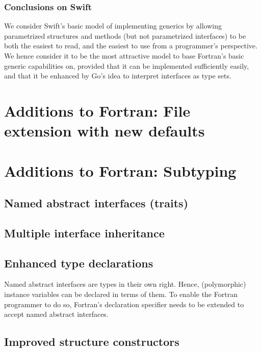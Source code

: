\documentclass[11pt,oneside]{article}
\newcommand{\code}[1]{{\selectfont\ttfamily{#1}}}
\begin{document}
\subsubsection{Conclusions on Swift}

We consider Swift's basic model of implementing generics by allowing
parametrized structures and methods (but not parametrized interfaces)
to be both the easiest to read, and the easiest to use from a
programmer's perspective. We hence consider it to be the most
attractive model to base Fortran's basic generic capabilities on,
provided that it can be implemented sufficiently easily, and that it
be enhanced by Go's idea to interpret interfaces as type sets.



\newpage

\section{Additions to Fortran: File extension with new defaults}

\section{Additions to Fortran: Subtyping}

\subsection{Named abstract interfaces (traits)}

\subsection{Multiple interface inheritance}

\subsection{Enhanced type declarations}

Named abstract interfaces are types in their own right. Hence,
(polymorphic) instance variables can be declared in terms of them. To
enable the Fortran programmer to do so, Fortran's \code{type}
declaration specifier needs to be extended to accept named abstract
interfaces.

\subsection{Improved structure constructors}
\end{document}
